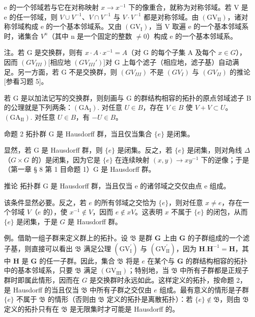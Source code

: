 e 的一个邻域若与它在对称映射 \(x \rightarrow x^{-1}\) 下的像重合，就称为对称邻域。若 V 是 e 的任一邻域，则 \(V \cup V^{-1}\)、\(V \cap V^{-1}\) 与 \(V \cdot V^{-1}\) 都是对称邻域。由 \((\mathrm{GV}_{\mathrm{II}})\)，诸对称邻域构成 e 的一个基本邻域系。又由 \((\mathrm{GV}_{\mathrm{I}})\)，当 V 取遍 e 的一个基本邻域系时，诸集合 \(V^{n}\)（其中 n 是一个固定的整数 \(\neq 0\)）构成 e 的一个基本邻域系。

注。若 G 是交换群，则有 \(x \cdot A \cdot x^{-1} = A\)（对 G 的每个子集 A 及每个 \(x \in G\)），因而 \((GV_{III})\){[}相应地 \((GV_{III}')\){]}对 G 上每个滤子（相应地，滤子基）自动满足。另一方面，若 G 不是交换群，则 \((GV_{III})\) 不是 \((GV_I)\) 与 \((GV_{II})\) 的推论{[}参看习题 5{]}。

若 G 是以加法记写的交换群，则刻画与 G 的群结构相容的拓扑的原点邻域滤子 B 的公理就是下列两条：\((\mathrm{GA}_{\mathrm{I}})\). 对任意 \(U \in B\)，存在 \(V \in B\) 使 \(V + V \subset U\)。\((\mathrm{GA}_{\mathrm{II}})\). 对任意 \(U \in B\)，有 \(-U \in B\)。

命题 2 拓扑群 G 是 Hausdorff 群，当且仅当集合 \(\{e\}\) 是闭集。

显然，若 G 是 Hausdorff 群，则 \(\{e\}\) 是闭集。反之，若 \(\{e\}\) 是闭集，则对角线 \(\Delta\)（\(G \times G\) 的）是闭集，因为它是 \(\{e\}\) 在连续映射 \((x, y) \to xy^{-1}\) 下的逆像；于是（第一章 § 8 第 1 目命题 1）G 是 Hausdorff 群。

推论 拓扑群 G 是 Hausdorff 群，当且仅当 e 的诸邻域之交仅由点 e 组成。

该条件显然必要。反之，若 \(e\) 的所有邻域之交恰为 \(\{e\}\)，则对任意 \(x \neq e\)，存在一个邻域 \(V\)（\(e\) 的），使 \(x^{-1} \notin V\)，因而 \(e \notin xV\)。这表明 \(x\) 不属于 \(\{e\}\) 的闭包，从而 \(\{e\}\) 是闭集，于是 \(G\) 是 Hausdorff 群。

例。借助一组子群来定义群上的拓扑。设 \(\mathfrak{B}\) 是群 \(\mathbf{G}\) 上由 \(\mathbf{G}\) 的子群组成的一个滤子基，则直接可以看出 \(\mathfrak{B}\) 满足公理 \((\mathrm{GV}_{\mathrm{I}}^{\prime})\) 与 \((\mathrm{GV}_{\mathrm{II}}^{\prime})\)，因为 \(\mathbf{H}.\mathbf{H}^{-1} = \mathbf{H}\)，其中 \(\mathbf{H}\) 是 \(\mathbf{G}\) 的任一子群。因此，集合 \(\mathfrak{B}\) 将是 \(e\) 在某个与 \(\mathbf{G}\) 的群结构相容的拓扑中的基本邻域系，只要 \(\mathfrak{B}\) 满足 \((\mathrm{GV}_{\mathrm{III}})\)；特别地，当 \(\mathfrak{B}\) 中所有子群都是正规子群时即属此情形，因而在 \(G\) 是交换群时永远如此。这样定义的拓扑，按命题 2，是 Hausdorff 的当且仅当 \(\mathfrak{B}\) 中所有子群之交仅由 \(e\) 组成。最有意义的情形是子群 \(\{e\}\) 不属于 \(\mathfrak{B}\) 的情形（否则由 \(\mathfrak{B}\) 定义的拓扑是离散拓扑）：若 \(\{e\} \notin \mathfrak{B}\)，则由 \(\mathfrak{B}\) 定义的拓扑只有在 \(\mathfrak{B}\) 是无限集时才可能是 Hausdorff 的。

